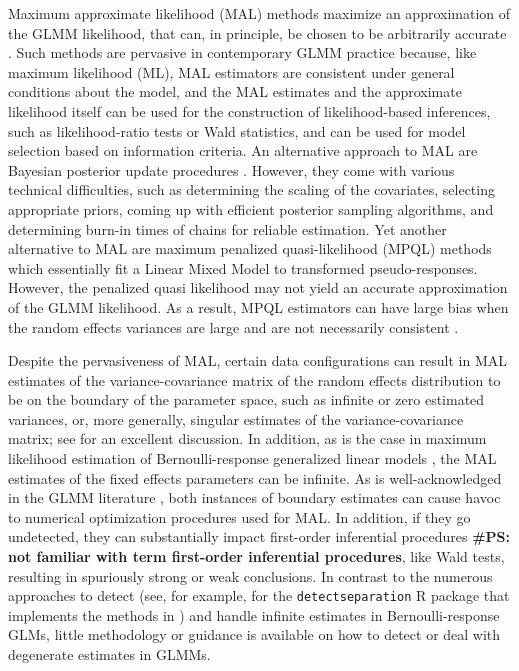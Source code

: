 \documentclass[11pt, a4paper]{article}
\newcommand{\PS}[1]{{\noindent \color{red} \bf \#PS: #1}}
\theoremstyle{example} \newtheorem{example}{Example}[section]
\theoremstyle{theorem} \newtheorem{theorem}{Theorem}[section]
\begin{document}
Maximum approximate likelihood (MAL) methods maximize an 
approximation of the GLMM likelihood, that can, in principle, be
chosen to be arbitrarily accurate \citep[see, for example,
][]{raudenbush2000maximum, pinheiro2006efficient}. Such methods are
pervasive in contemporary GLMM practice because, like maximum
likelihood (ML), MAL estimators are consistent under general conditions
about the model, and the MAL estimates and the approximate likelihood
itself can be used for the construction of likelihood-based
inferences, such as likelihood-ratio tests or Wald
statistics, and can be used for model selection based on information criteria. An
alternative approach to MAL are Bayesian posterior update procedures
\citep[see, for example,][]{zhao2006general}. However, they come with
various technical difficulties, such as determining the scaling of the
covariates, selecting appropriate priors, coming up with efficient
posterior sampling algorithms, and determining burn-in times of chains
for reliable estimation. Yet another alternative to MAL are maximum
penalized quasi-likelihood (MPQL) methods \citep{schall1991estimation,
  wolfinger1993generalized, breslow1993approximate} which essentially fit a Linear Mixed Model to transformed pseudo-responses. However, the penalized quasi likelihood may not
yield an accurate approximation of the GLMM likelihood. As a result,
MPQL estimators can have large bias when the random effects
variances are large
\citep{bolker2009generalized,rodriguez1995assessment} and are
not necessarily consistent \citep[Chapter 3.1]{jiang2017asymptotic}.

Despite the pervasiveness of MAL, certain data configurations can
result in MAL estimates of the variance-covariance matrix of the
random effects distribution to be on the boundary of the parameter
space, such as infinite or zero estimated variances, or, more
generally, singular estimates of the variance-covariance matrix; see
\cite{blme} for an excellent discussion. In
addition, as is the case in maximum likelihood estimation of
Bernoulli-response generalized linear models \citep[GLMs; see, for
example][Chapter 4]{mccullagh+nelder:1989}, the MAL estimates of the
fixed effects parameters can be
infinite. As is well-acknowledged in the GLMM literature \citep[see,
for example][]{bolker2009generalized, bolker2018digression,
  pasch2013interspecific}, both instances of boundary estimates can
cause havoc to numerical optimization procedures used for MAL. In
addition, if they go undetected, they can substantially impact
first-order inferential procedures \PS{not familiar with term first-order inferential procedures}, like Wald tests, resulting in
spuriously strong or weak conclusions. In contrast to the
numerous approaches to detect (see, for example,
\citealt{schumacher2021detect} for the \texttt{detectseparation} R
package that implements the methods in \citealt{konis2017linear}) and
handle \citep[see, for example,][]{kosmidis2021jeffreys,
  heinze2002solution, gelman2008weakly, shen2008solution} infinite
estimates in Bernoulli-response GLMs, little methodology or guidance
is available on how to detect or deal with degenerate estimates in
GLMMs.
\end{document}
